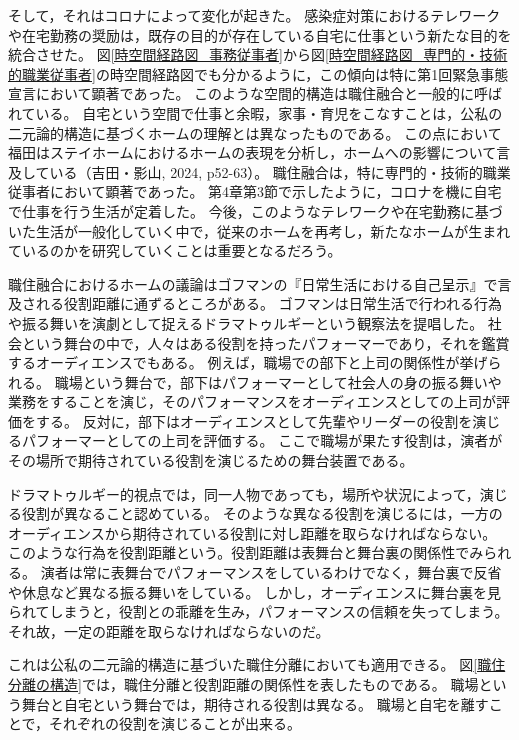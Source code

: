 \documentclass[paper={210mm,297mm},fontsize=15Q,line_length=35zw,number_of_lines=31,head_space=30mm,gutter=40mm,baselineskip=2.0zw,headfoot_verticalposition=1.5zw]{jlreq}
\begin{document}
そして，それはコロナによって変化が起きた。
感染症対策におけるテレワークや在宅勤務の奨励は，既存の目的が存在している自宅に仕事という新たな目的を統合させた。
図\ref{時空間経路図_事務従事者}から図\ref{時空間経路図_専門的・技術的職業従事者}の時空間経路図でも分かるように，この傾向は特に第1回緊急事態宣言において顕著であった。
このような空間的構造は職住融合と一般的に呼ばれている。
自宅という空間で仕事と余暇，家事・育児をこなすことは，公私の二元論的構造に基づくホームの理解とは異なったものである。
この点において福田はステイホームにおけるホームの表現を分析し，ホームへの影響について言及している（吉田・影山, 2024, p52-63）。
職住融合は，特に専門的・技術的職業従事者において顕著であった。
第4章第3節で示したように，コロナを機に自宅で仕事を行う生活が定着した。
今後，このようなテレワークや在宅勤務に基づいた生活が一般化していく中で，従来のホームを再考し，新たなホームが生まれているのかを研究していくことは重要となるだろう。

職住融合におけるホームの議論はゴフマンの『日常生活における自己呈示』で言及される役割距離に通ずるところがある。
ゴフマンは日常生活で行われる行為や振る舞いを演劇として捉えるドラマトゥルギーという観察法を提唱した。
社会という舞台の中で，人々はある役割を持ったパフォーマーであり，それを鑑賞するオーディエンスでもある。
例えば，職場での部下と上司の関係性が挙げられる。
職場という舞台で，部下はパフォーマーとして社会人の身の振る舞いや業務をすることを演じ，そのパフォーマンスをオーディエンスとしての上司が評価をする。
反対に，部下はオーディエンスとして先輩やリーダーの役割を演じるパフォーマーとしての上司を評価する。
ここで職場が果たす役割は，演者がその場所で期待されている役割を演じるための舞台装置である。

ドラマトゥルギー的視点では，同一人物であっても，場所や状況によって，演じる役割が異なること認めている。
そのような異なる役割を演じるには，一方のオーディエンスから期待されている役割に対し距離を取らなければならない。
このような行為を役割距離という。役割距離は表舞台と舞台裏の関係性でみられる。
演者は常に表舞台でパフォーマンスをしているわけでなく，舞台裏で反省や休息など異なる振る舞いをしている。
しかし，オーディエンスに舞台裏を見られてしまうと，役割との乖離を生み，パフォーマンスの信頼を失ってしまう。
それ故，一定の距離を取らなければならないのだ。

これは公私の二元論的構造に基づいた職住分離においても適用できる。
図\ref{職住分離の構造}では，職住分離と役割距離の関係性を表したものである。
職場という舞台と自宅という舞台では，期待される役割は異なる。
職場と自宅を離すことで，それぞれの役割を演じることが出来る。
\end{document}
